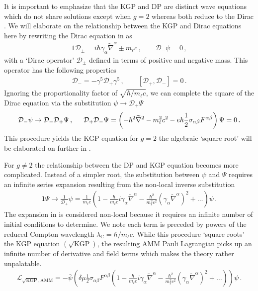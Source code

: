 It is important to emphasize that the KGP  and DP  are distinct wave equations which do not share solutions except when $g\!=\!2$ whereas both reduce to the Dirac . We will elaborate on the relationship between the KGP and Dirac equations here by rewriting the Dirac equation in  as
\begin{alignat}{1}
	\label{do:1} \mathcal{D}_{\pm}=i\hbar\gamma_{\alpha}\widetilde\nabla^{\alpha}\pm m_{\ell}c\,,\qquad
    \mathcal{D}_{-}\psi=0\,,
\end{alignat}
with a `Dirac operator' $\mathcal{D}_{\pm}$ defined in terms of positive and negative mass. This operator has the following properties
\begin{gather}
    \label{do:2}
    \mathcal{D}_{-}=-\gamma^{5}\mathcal{D}_{+}\gamma^{5}\,,\qquad
    [\mathcal{D}_{+},\mathcal{D}_{-}]=0\,.
\end{gather}
Ignoring the proportionality factor of $\sqrt{\hbar/m_{\ell}c}$, we can complete the square of the Dirac equation via the substitution $\psi\rightarrow\mathcal{D}_{+}\Psi$
\begin{alignat}{1}
	\label{do:3} \mathcal{D}_{-}\psi\rightarrow\mathcal{D}_{-}\mathcal{D}_{+}\Psi\,,\indent\mathcal{D}_{+}\mathcal{D}_{-}\Psi=\left(-\hbar^{2}\widetilde\nabla^{2}-m_{\ell}^{2}c^{2}-e\hbar\frac{1}{2}\sigma_{\alpha\beta}F^{\alpha\beta}\right)\Psi=0\,.
\end{alignat}
This procedure yields the KGP equation for $g\!=\!2$ the algebraic `square root' will be elaborated on further in .

For $g\!\neq\!2$ the relationship between the DP and KGP equation becomes more complicated. Instead of a simpler root, the substitution between $\psi$ and $\Psi$ requires an infinite series expansion resulting from the non-local inverse substitution 
\begin{alignat}{1}
	\label{nonlocal:1} \Psi\rightarrow\frac{1}{\mathcal{D}_{+}}\psi = \frac{1}{m_{\ell}c}\left(1 - \frac{\hbar}{m_{\ell}c}i\gamma_{\alpha}\widetilde\nabla^{\alpha} - \frac{\hbar^{2}}{m_{\ell}^{2}c^{2}}\left(\gamma_{\alpha}\widetilde\nabla^{\alpha}\right)^{2} + \ldots\right)\psi\,.
\end{alignat}
The expansion in  is considered non-local because it requires an infinite number of initial conditions to determine. We note each term is preceded by powers of the reduced Compton wavelength $\lambda_\mathrm{C}=\hbar/m_{\ell}c$. While this procedure `square roots' the KGP equation $(\mathrm{\sqrt{KGP}})$, the resulting AMM Pauli Lagrangian  picks up an infinite number of derivative and field terms which makes the theory rather unpalatable.
\begin{gather}
    \label{lamm:2}
    \mathcal{L}_\mathrm{\sqrt{KGP},AMM} = -{\bar\psi}\left(\delta\mu\frac{1}{2}\sigma_{\alpha\beta}F^{\alpha\beta}\left(1 - \frac{\hbar}{m_{\ell}c}i\gamma_{\alpha}\widetilde\nabla^{\alpha} - \frac{\hbar^{2}}{m_{\ell}^{2}c^{2}}\left(\gamma_{\alpha}\widetilde\nabla^{\alpha}\right)^{2} + \ldots\right)\right)\psi\,.
\end{gather}

